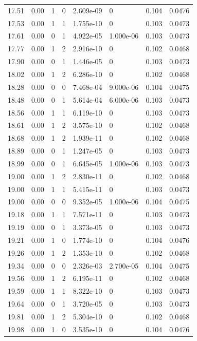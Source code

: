 \documentclass[preview]{standalone}
\begin{document}
{{{{{\begin{tabular}{L{1.2cm}C{1.2cm} C{0.3cm}C{0.5cm} C{1.4cm}C{1.4cm} C{1.4cm}C{1.4cm}}
  17.51  &  0.00  & 1     &  0 &  2.609e-09  & 0  & 0.104 &  0.0476   \\ 
  17.53  &  0.00  & 1     &  1 &  1.755e-10  & 0  & 0.103 &  0.0473   \\ 
  17.61  &  0.00  & 0     &  1 &  4.922e-05  & 1.000e-06  & 0.103 &  0.0473   \\ 
  17.77  &  0.00  & 1     &  2 &  2.916e-10  & 0  & 0.102 &  0.0468   \\ 
  17.90  &  0.00  & 0     &  1 &  1.446e-05  & 0  & 0.103 &  0.0473   \\ 
  18.02  &  0.00  & 1     &  2 &  6.286e-10  & 0  & 0.102 &  0.0468   \\ 
  18.28  &  0.00  & 0     &  0 &  7.468e-04  & 9.000e-06  & 0.104 &  0.0475   \\ 
  18.48  &  0.00  & 0     &  1 &  5.614e-04  & 6.000e-06  & 0.103 &  0.0473   \\ 
  18.56  &  0.00  & 1     &  1 &  6.119e-10  & 0  & 0.103 &  0.0473   \\ 
  18.61  &  0.00  & 1     &  2 &  3.575e-10  & 0  & 0.102 &  0.0468   \\ 
  18.68  &  0.00  & 1     &  2 &  1.939e-11  & 0  & 0.102 &  0.0468   \\ 
  18.89  &  0.00  & 0     &  1 &  1.247e-05  & 0  & 0.103 &  0.0473   \\ 
  18.99  &  0.00  & 0     &  1 &  6.645e-05  & 1.000e-06  & 0.103 &  0.0473   \\ 
  19.00  &  0.00  & 1     &  2 &  2.830e-11  & 0  & 0.102 &  0.0468   \\ 
  19.00  &  0.00  & 1     &  1 &  5.415e-11  & 0  & 0.103 &  0.0473   \\ 
  19.00  &  0.00  & 0     &  0 &  9.352e-05  & 1.000e-06  & 0.104 &  0.0475   \\ 
  19.18  &  0.00  & 1     &  1 &  7.571e-11  & 0  & 0.103 &  0.0473   \\ 
  19.19  &  0.00  & 0     &  1 &  3.373e-05  & 0  & 0.103 &  0.0473   \\ 
  19.21  &  0.00  & 1     &  0 &  1.774e-10  & 0  & 0.104 &  0.0476   \\ 
  19.26  &  0.00  & 1     &  2 &  1.353e-10  & 0  & 0.102 &  0.0468   \\ 
  19.34  &  0.00  & 0     &  0 &  2.326e-03  & 2.700e-05  & 0.104 &  0.0475   \\ 
  19.56  &  0.00  & 1     &  2 &  6.195e-11  & 0  & 0.102 &  0.0468   \\ 
  19.59  &  0.00  & 1     &  1 &  8.322e-10  & 0  & 0.103 &  0.0473   \\ 
  19.64  &  0.00  & 0     &  1 &  3.720e-05  & 0  & 0.103 &  0.0473   \\ 
  19.81  &  0.00  & 1     &  2 &  5.304e-10  & 0  & 0.102 &  0.0468   \\ 
  19.98  &  0.00  & 1     &  0 &  3.535e-10  & 0  & 0.104 &  0.0476   \\ 
\hline 
\end{tabular} 

}}}}}
\end{document}
